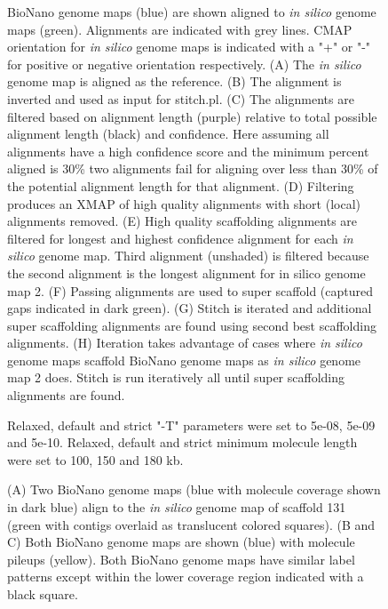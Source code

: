 \documentclass{bmcart}
\begin{document}
\begin{backmatter}
\begin{figure}[h!]
{      BioNano genome maps (blue) are shown aligned to \textit{in silico} genome maps (green). Alignments are indicated with grey lines. CMAP orientation for \textit{in silico} genome maps is indicated with a "+" or "-" for positive or negative orientation respectively. (A) The \textit{in silico} genome map is aligned as the reference. (B) The alignment is inverted and used as input for stitch.pl. (C) The alignments are filtered based on alignment length (purple) relative to total possible alignment length (black) and confidence. Here assuming all alignments have a high confidence score and the minimum percent aligned is 30\% two alignments fail for aligning over less than 30\% of the potential alignment length for that alignment. (D) Filtering produces an XMAP of high quality alignments with short (local) alignments removed. (E) High quality scaffolding alignments are filtered for longest and highest confidence alignment for each \textit{in silico} genome map. Third alignment (unshaded) is filtered because the second alignment is the longest alignment for {in silico} genome map 2. (F) Passing alignments are used to super scaffold (captured gaps indicated in dark green). (G) Stitch is iterated and additional super scaffolding alignments are found using second best scaffolding alignments. (H) Iteration takes advantage of cases where \textit{in silico} genome maps scaffold BioNano genome maps as \textit{in silico} genome map 2 does. Stitch is run iteratively all until super scaffolding alignments are found.}
      \end{figure} 
\begin{figure}[h!]
	\caption{
		Relaxed, default and strict "-T" parameters were set to 5e-08, 5e-09 and 5e-10. Relaxed, default and strict minimum molecule length were set to 100, 150 and 180 kb.}
\end{figure}     
\begin{figure}[h!]
	\caption{
		(A) Two BioNano genome maps (blue with molecule coverage shown in dark blue) align to the \textit{in silico} genome map of scaffold 131 (green with contigs overlaid as translucent colored squares). (B and C) Both BioNano genome maps are shown (blue) with molecule pileups (yellow). Both BioNano genome maps have similar label patterns except within the lower coverage region indicated with a black square.}
\end{figure}  

\end{backmatter}
\end{document}
